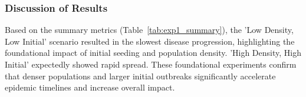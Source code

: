 \documentclass[12pt]{article}
\begin{document}
\begin{table}[H]
\centering
\caption{Summary Metrics for Experiment Suite 1: Foundations}
\label{tab:exp1_summary}
\end{table}

\subsubsection*{Discussion of Results}
Based on the summary metrics (Table~\ref{tab:exp1_summary}), the 'Low Density, Low Initial' scenario resulted in the slowest disease progression, highlighting the foundational impact of initial seeding and population density. 'High Density, High Initial' expectedly showed rapid spread. These foundational experiments confirm that denser populations and larger initial outbreaks significantly accelerate epidemic timelines and increase overall impact.
\end{document}
